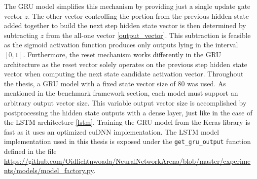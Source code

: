 \documentclass[draft,final]{vutinfth} %
\begin{document}
The GRU model simplifies this mechanism by providing just a single update gate vector $z$.
The other vector controlling the portion from the previous hidden state added together to build the next step hidden state vector is then determined by subtracting $z$ from the all-one vector \ref{output_vector}.
This subtraction is feasible as the sigmoid activation function produces only outputs lying in the interval $[0,1]$.
Furthermore, the reset mechanism works differently in the GRU architecture as the reset vector solely operates on the previous step hidden state vector when computing the next state candidate activation vector.
Throughout the thesis, a GRU model with a fixed state vector size of $80$ was used. As mentioned in the benchmark framework section, each model must support an arbitrary output vector size.
This variable output vector size is accomplished by postprocessing the hidden state outputs with a dense layer, just like in the case of the LSTM architecture \ref{lstm}.
Training the GRU model from the Keras library is fast as it uses an optimized cuDNN \cite{cuDNN} implementation.
The LSTM model implementation used in this thesis is exposed under the \texttt{get\_gru\_output} function defined in the file \url{https://github.com/Oidlichtnwoada/NeuralNetworkArena/blob/master/experiments/models/model_factory.py}.
\end{document}
